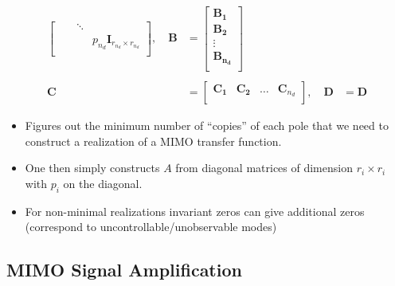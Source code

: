 \begin{enumerate}
\begin{align*}
\begin{bmatrix}
                                                               &                                & \ddots &                                            \\
                                                               &                                &        & p_{n_d} \mathbf{I}_{r_{n_d}\times r_{n_d}} \\
                            \end{bmatrix},\quad
              \mathbf{B} & =\begin{bmatrix}
                                \mathbf{B_1}     \\
                                \mathbf{B_2}     \\
                                \vdots           \\
                                \mathbf{B_{n_d}} \\
                            \end{bmatrix}                                                                               \\                                                                             \\
              \mathbf{C} & =\begin{bmatrix}
                                \mathbf{C_1} & \mathbf{C_2} & \dots & \mathbf{C}_{n_d} \\
                            \end{bmatrix}, \quad
              \mathbf{D} & = \mathbf{D}                                                                                                           
          \end{align*}
\end{enumerate}


\begin{itemize}
    \item Figures out the minimum number of ``copies'' of each pole that we need to construct a realization of a MIMO transfer function.
    \item One then simply constructs $A$ from diagonal matrices of dimension $r_i\times r_i$ with $p_i$ on the diagonal.
    \item For non-minimal realizations invariant zeros can give additional zeros (correspond to uncontrollable/unobservable modes)
\end{itemize}

\subsection{MIMO Signal Amplification}

